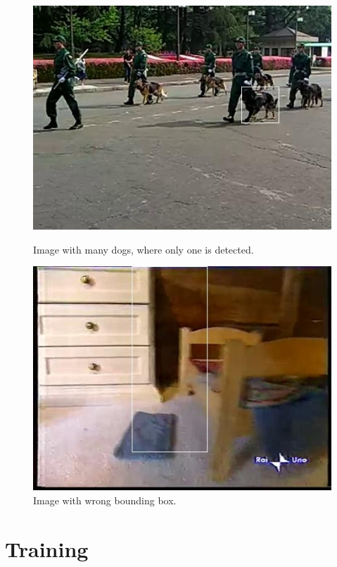 \documentclass{article}
\begin{document}
\begin{figure}[H]

\begin{minipage}{.4\textwidth}
	\includegraphics[width=\textwidth]{multiple_dogs.jpg}
	\caption{Image with many dogs, where only one is detected.}
\end{minipage}%
\hfill
\begin{minipage}{.4\textwidth}
	\includegraphics[width=\textwidth]{wrong_bb.jpg}
	\caption{Image with wrong bounding box.}
\end{minipage}%
\hfill

\end{figure}


\section*{Training}
\end{document}
